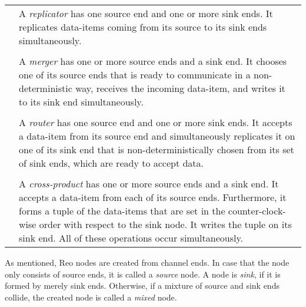 \begin{table}[H]
\centering
\begin{tabular}{cp{10cm}}
 \raisebox{-.2cm}{\replicatorNode} & A \emph{replicator} has one source end and one or more sink ends. It replicates data-items coming from its source to its sink ends simultaneously. \\
 & \\
\raisebox{-.2cm}{\mergerNode} & A \emph{merger} has one or more source ends and a sink end. It chooses one of its source ends that is ready to communicate in a non-deterministic way, receives the incoming data-item, and  writes it to its sink end simultaneously.
\\ & \\
\raisebox{-.2cm}{\routerNode} & A \emph{router} has one source end and one or more sink ends. It accepts a data-item from its source end and simultaneously replicates it on one of its sink end that is non-deterministically chosen from its set of sink ends, which are ready to accept data. \\
& \\ 
\raisebox{-.2cm}{{\joinNodeWithTweeineenout}}  & A \emph{cross-product} has one or more source ends and a sink end. It accepts a data-item from each of its source ends. Furthermore, it forms a tuple of the data-items that are set in the counter-clock-wise order with respect to the sink node. It writes the tuple on its sink end. All of these operations occur simultaneously. 
\\%
\end{tabular}
\label{table:aa}
\end{table}


As mentioned, Reo nodes are created from channel ends. In case that the node only consists of source ends, it is called a \emph{source} node. A node is \emph{sink}, if it is formed by merely sink ends. Otherwise, if a mixture of source and sink ends collide, the created node is called a \emph{mixed} node.


